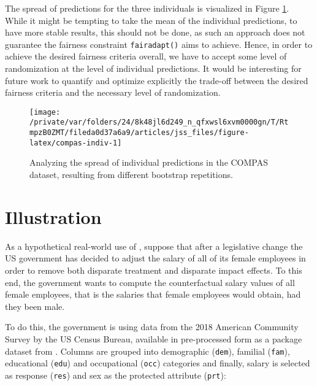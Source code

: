 \documentclass[
  nojss]{jss}
\begin{document}
The spread of predictions for the three individuals is visualized in
Figure \ref{fig:compas-indiv}. While it might be tempting to take the
mean of the individual predictions, to have more stable results, this
should not be done, as such an approach does not guarantee the fairness
constraint \texttt{fairadapt()} aims to achieve. Hence, in order to
achieve the desired fairness criteria overall, we have to accept some
level of randomization at the level of individual predictions. It would
be interesting for future work to quantify and optimize explicitly the
trade-off between the desired fairness criteria and the necessary level
of randomization.

\begin{CodeChunk}
\begin{figure}

{\centering \texttt{[image: /private/var/folders/24/8k48jl6d249\_n\_qfxwsl6xvm0000gn/T/RtmpzB0ZMT/fileda0d37a6a9/articles/jss\_files/figure-latex/compas-indiv-1]} 

}

\caption[Analyzing the spread of individual predictions in the COMPAS dataset, resulting from different bootstrap repetitions]{Analyzing the spread of individual predictions in the COMPAS dataset, resulting from different bootstrap repetitions.}\label{fig:compas-indiv}
\end{figure}
\end{CodeChunk}

\hypertarget{illustration}{%
\section{Illustration}\label{illustration}}

As a hypothetical real-world use of , suppose that after
a legislative change the US government has decided to adjust the salary
of all of its female employees in order to remove both disparate
treatment and disparate impact effects. To this end, the government
wants to compute the counterfactual salary values of all female
employees, that is the salaries that female employees would obtain, had
they been male.

To do this, the government is using data from the 2018 American
Community Survey by the US Census Bureau, available in pre-processed
form as a package dataset from . Columns are grouped into
demographic (\texttt{dem}), familial (\texttt{fam}), educational
(\texttt{edu}) and occupational (\texttt{occ}) categories and finally,
salary is selected as response (\texttt{res}) and sex as the protected
attribute (\texttt{prt}):
\end{document}
